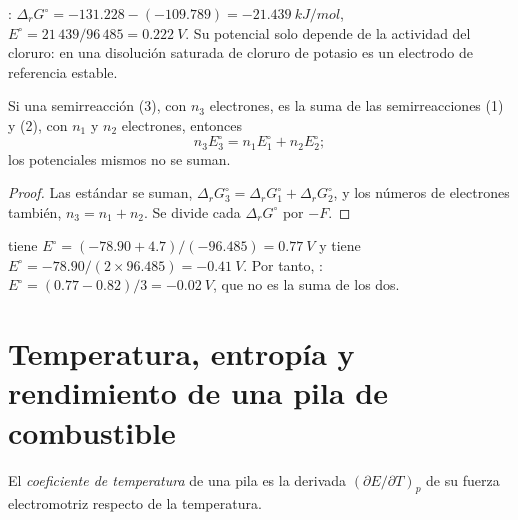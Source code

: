 \begin{example}\label{ex:b2:cell-thermodynamics:agcl}
: $\Delta_r G^\circ = -131.228 - (-109.789) =
\qty{-21.439}{kJ/mol}$, $E^\circ = 21\,439/96\,485 = \qty{0.222}{V}$. Su potencial
solo depende de la actividad del cloruro: en una disolución saturada de cloruro de potasio
es un electrodo de referencia estable.
\end{example}

\begin{proposition}\label{prop:b2:cell-thermodynamics:combining}
Si una semirreacción (3), con $n_3$ electrones, es la suma de las semirreacciones (1)
y (2), con $n_1$ y $n_2$ electrones, entonces
\[
  n_3E_3^\circ = n_1E_1^\circ + n_2E_2^\circ ;
\]
los potenciales mismos no se suman.
\end{proposition}

\begin{proof}
Las  estándar se suman, $\Delta_r G_3^\circ = \Delta_r G_1^\circ + \Delta_r
G_2^\circ$, y los números de electrones también, $n_3 = n_1 + n_2$. Se divide cada $\Delta_r
G^\circ$ por $-F$.
\end{proof}

\begin{example}\label{ex:b2:cell-thermodynamics:iron}
 tiene $E^\circ = (-78.90 + 4.7)/(-96.485) = \qty{0.77}{V}$
y  tiene $E^\circ = -78.90/(2 \times 96.485) =
\qty{-0.41}{V}$. Por tanto, : $E^\circ = (0.77 - 0.82)/3 =
\qty{-0.02}{V}$, que no es la suma de los dos.
\end{example}

\section{Temperatura, entropía y rendimiento de una pila de combustible}

\begin{definition}\label{def:b2:cell-thermodynamics:temperature-coefficient}
El \emph{coeficiente de temperatura} de una pila es
la derivada $(\partial E/\partial T)_p$ de su fuerza electromotriz respecto de
la temperatura.
\end{definition}

